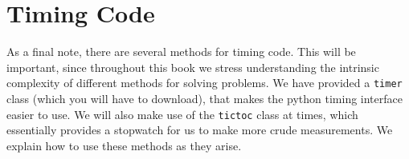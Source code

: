 \section*{Timing Code}

As a final note, there are several methods for timing code. This will be important, since throughout this book we stress understanding the intrinsic complexity of different methods for solving problems. We have provided a {\tt timer} class (which you will have to download), that makes the python timing interface easier to use. We will also make use of the {\tt tictoc} class at times, which essentially provides a stopwatch for us to make more crude measurements. We explain how to use these methods as they arise.

%
%
%
%
%
